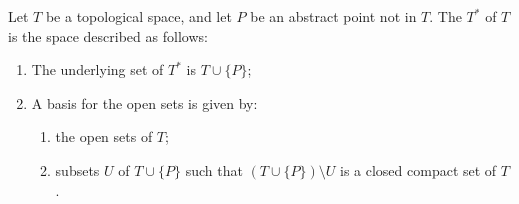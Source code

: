 Let $T$ be a topological space, and let $P$ be an abstract point not in $T$. The  $T^{*}$ of $T$ is the space described as follows:

\begin{enumerate}
\item[(5.9.1)] The underlying set of $T^{*}$ is $T \cup \{P\}$;
\item[(5.9.2)] A basis for the open sets is given by:
  \begin{enumerate}
  \item[(a)] the open sets of $T$;
  \item[(b)] subsets $U$ of $T \cup \{P\}$ such that $(T \cup \{P\}) \setminus U$ is a closed compact set of $T$.
  \end{enumerate}
\end{enumerate}
